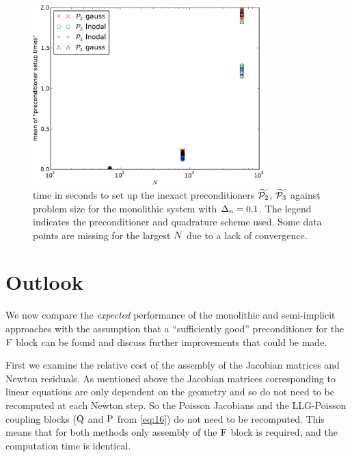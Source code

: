 \begin{figure}
  \centering
  \includegraphics[width=0.8\textwidth]{plots/linear_solvers_p2p3/implicitilu-1-meanofpreconditionersetuptimesvsinitialnnode.pdf}
  \caption{
    \newtonmean{}
    time in seconds to set up the inexact preconditioners $\widetilde{\mathcal{P}_2}$, $\widetilde{\mathcal{P}_3}$ against problem size for the monolithic system with $\Delta_{n}=0.1$.
    The legend indicates the preconditioner and quadrature scheme used.
    \manydatapointsPrecLegend{}
    Some data points are missing for the largest $N$ due to a lack of convergence.
  }
  \label{fig:times-p23-ilu1}
\end{figure}




\section{Outlook}
\label{sec:furth-optim-opport}

We now compare the \emph{expected} performance of the monolithic and semi-implicit approaches with the assumption that a ``sufficiently good'' preconditioner for the $\mathrm{F}$ block can be found and discuss further improvements that could be made.

First we examine the relative cost of the assembly of the Jacobian matrices and Newton residuals.
As mentioned above the Jacobian matrices corresponding to linear equations are only dependent  on the geometry and so do not need to be recomputed at each Newton step.
So the Poisson Jacobians and the LLG-Poisson coupling blocks ($\mathrm{Q}$ and $\mathrm{P}$ from \cref{eq:16}) do not need to be recomputed.
This means that for both methods only assembly of the $\mathrm{F}$ block is required, and the computation time is identical.

